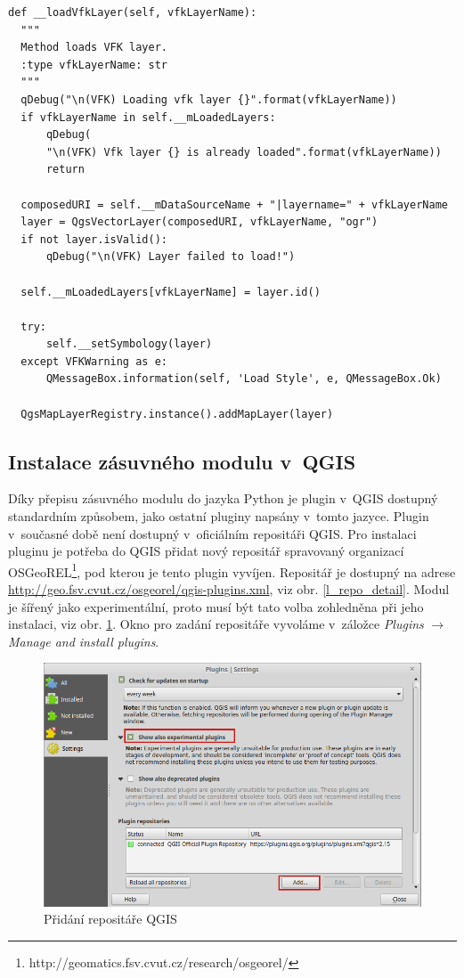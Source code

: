\documentclass[a4paper,12pt,oneside]{book}
\begin{document}
\newpage
\begin{lstlisting}[style=python, 
		    caption=Kód pro načtení vektorové vrstvy v~jazyce Python,
		    label=l_loadLayerPython]
def __loadVfkLayer(self, vfkLayerName):
  """
  Method loads VFK layer.
  :type vfkLayerName: str
  """
  qDebug("\n(VFK) Loading vfk layer {}".format(vfkLayerName))
  if vfkLayerName in self.__mLoadedLayers:
      qDebug(
	  "\n(VFK) Vfk layer {} is already loaded".format(vfkLayerName))
      return

  composedURI = self.__mDataSourceName + "|layername=" + vfkLayerName
  layer = QgsVectorLayer(composedURI, vfkLayerName, "ogr")
  if not layer.isValid():
      qDebug("\n(VFK) Layer failed to load!")

  self.__mLoadedLayers[vfkLayerName] = layer.id()

  try:
      self.__setSymbology(layer)
  except VFKWarning as e:
      QMessageBox.information(self, 'Load Style', e, QMessageBox.Ok)

  QgsMapLayerRegistry.instance().addMapLayer(layer)
\end{lstlisting}

\subsection{Instalace zásuvného modulu v~QGIS}
Díky přepisu zásuvného modulu do jazyka Python je plugin v~QGIS dostupný standardním způsobem, jako ostatní pluginy napsány v~tomto jazyce. Plugin v~současné době není dostupný v~oficiálním repositáři QGIS. Pro instalaci pluginu je potřeba do QGIS přidat nový repositář spravovaný organizací OSGeoREL\footnote{http://geomatics.fsv.cvut.cz/research/osgeorel/}, pod kterou je tento plugin vyvíjen. Repositář je dostupný na adrese \url{http://geo.fsv.cvut.cz/osgeorel/qgis-plugins.xml}, viz obr. \ref{l_repo_detail}. Modul je šířený jako experimentální, proto musí být tato volba zohledněna při jeho instalaci, viz obr. \ref{l_qgis_plugins}. Okno pro zadání repositáře vyvoláme v~záložce \textit{Plugins} $\rightarrow$ \textit{Manage and install plugins}.

\begin{figure}[htb]
\centering
\includegraphics[width=1\textwidth]{images/qgis_repo_plugins.png}
\caption[Přidání repositáře QGIS]{Přidání repositáře QGIS}
\label{l_qgis_plugins}
\end{figure}
\end{document}

